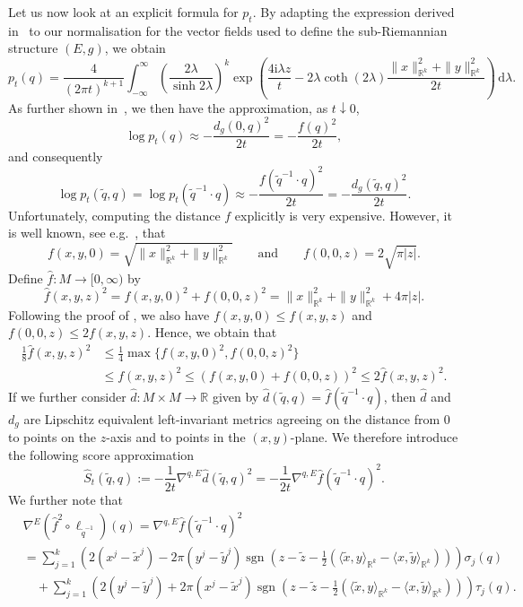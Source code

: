 \documentclass[10pt]{amsart}
\theoremstyle{remark}
\DeclareMathOperator{\sgn}{sgn}
\newcommand{\R}{\mathbb{R}}
\newcommand{\dd}{\,{\mathrm d}}
\newcommand{\im}{\mathrm{i}}
\numberwithin{equation}{section}
\begin{document}
Let us now look at an explicit formula for $p_t$. By adapting the expression derived in~\cite{gaveau1977principe} to our normalisation for the vector fields used to define the sub-Riemannian structure $(E,g)$, we obtain
 $$p_t(q) = \frac{4}{(2\pi t)^{k+1}} \int_{-\infty}^{\infty} \left( \frac{2\lambda}{\sinh 2\lambda} \right)^k  \exp\left(\frac{4\im\lambda z}{t}-2\lambda \coth(2\lambda) \frac{\|x\|_{\R^k}^2 +\|y\|_{\R^k}^2}{2t}\right)\dd\lambda.$$
As further shown in~\cite{gaveau1977principe}, we then have the approximation, as $t\downarrow 0$,
$$\log p_t(q) \approx -\frac{d_g(0,q)^2}{2t} = - \frac{f(q)^2}{2t},$$
and consequently
$$\log p_t(\tilde q, q) = \log p_t(\tilde q^{-1} \cdot q) \approx - \frac{f(\tilde q^{-1} \cdot q)^2}{2t} = -\frac{d_g(\tilde q,q)^2}{2t}.$$
Unfortunately, computing the distance $f$ explicitly is very expensive. However, it is well known, see e.g.~\cite{ABB}, that
$$f(x,y,0) = \sqrt{\|x\|_{\mathbb{R}^k}^2 + \|y\|_{\mathbb{R}^k}^2} \qquad\text{and}\qquad f(0,0,z) = 2 \sqrt{\pi |z|}.$$
Define $\hat f\colon M\to[0,\infty)$ by
$$\hat f(x,y,z)^2 = f(x,y,0)^2 + f(0,0,z)^2 = \| x\|_{\mathbb{R}^k}^2 + \| y\|_{\mathbb{R}^k}^2 +4 \pi |z|.$$
Following the proof of \cite[Example~4.1]{grong2022geometric}, we also have $f(x,y,0) \leq f(x,y,z)$ and $f(0,0,z) \leq 2f(x,y,z)$. Hence, we obtain that
\begin{align*}
\frac{1}{8} \hat f(x,y,z)^2 & \leq \frac{1}{4}\max \{ f(x,y,0)^2, f(0,0,z)^2\} \\
& \leq f(x,y,z)^2  \leq ( f(x,y,0) + f(0,0,z))^2 \leq 2\hat f(x,y,z)^2.
\end{align*}
If we further consider $\hat d\colon M\times M\to\R$ given by $\hat d(\tilde q, q) = \hat f(\tilde q^{-1} \cdot q)$, then $\hat d$ and $d_g$ are Lipschitz equivalent left-invariant metrics agreeing on the distance from $0$ to points on the $z$-axis and to points in the $(x,y)$-plane. We therefore introduce the following score approximation
$$\hat S_t(\tilde q, q) := - \frac{1}{2t} \nabla^{q,E} \hat d(\tilde q, q)^2 = -\frac{1}{2t} \nabla^{q,E} \hat f(\tilde q^{-1} \cdot q)^2.$$
We further note that
\begin{align*}
& \nabla^{E} \left(\hat f^2\circ \ell_{\tilde q^{-1}}\right)(q) = \nabla^{q,E} \hat f\left(\tilde q^{-1} \cdot q  \right)^2 \\
& = \sum_{j=1}^k \left( 2 (x^j-\tilde x^j)- 2\pi(y^j - \tilde y^j)\sgn\left(z - \tilde z - \frac{1}{2} (\langle \tilde x,  y \rangle_{\mathbb{R}^k} - \langle x, \tilde y\rangle_{\mathbb{R}^k})\right)\right) \sigma_j( q)\\
& \quad + \sum_{j=1}^k \left(2  (y^j - \tilde y^j) + 2\pi (x^j - \tilde x^j)\sgn\left(z - \tilde z - \frac{1}{2} (\langle \tilde x,  y \rangle_{\mathbb{R}^k} - \langle x, \tilde y\rangle_{\mathbb{R}^k})\right)\right) \tau_j(q).
\end{align*}
\end{document}
